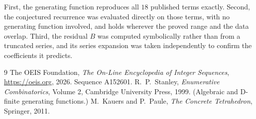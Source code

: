 \documentclass[11pt,a4paper]{article}
\theoremstyle{plain}
\theoremstyle{definition}
\begin{document}
First, the generating function reproduces all $18$ published terms exactly. Second,
the conjectured recurrence was evaluated directly on those terms, with no generating function
involved, and holds wherever the proved range and the data overlap. Third, the residual $B$ was
computed symbolically rather than from a truncated series, and its series expansion was taken
independently to confirm the coefficients it predicts.

\begin{thebibliography}{9}
 The OEIS Foundation, \emph{The On-Line Encyclopedia of Integer Sequences},
\url{https://oeis.org}, 2026. Sequence A152601.
 R.~P.~Stanley, \emph{Enumerative Combinatorics}, Volume 2, Cambridge
University Press, 1999. (Algebraic and D-finite generating functions.)
 M.~Kauers and P.~Paule, \emph{The Concrete Tetrahedron}, Springer, 2011.
\end{thebibliography}
\end{document}
